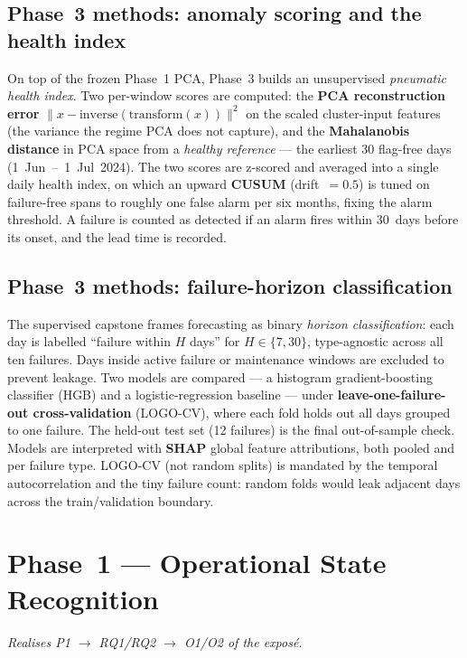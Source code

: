 \documentclass[11pt,a4paper]{article}
\begin{document}
\subsection{Phase~3 methods: anomaly scoring and the health index}
On top of the frozen Phase~1 PCA, Phase~3 builds an unsupervised \emph{pneumatic health
index}. Two per-window scores are computed: the \textbf{PCA reconstruction error}
$\lVert x - \mathrm{inverse}(\mathrm{transform}(x))\rVert^2$ on the scaled cluster-input
features (the variance the regime PCA does not capture), and the \textbf{Mahalanobis
distance} in PCA space from a \emph{healthy reference} --- the earliest 30 flag-free days
(1~Jun~--~1~Jul~2024). The two scores are z-scored and averaged into a single daily
health index, on which an upward \textbf{CUSUM} (drift~$=0.5$) is tuned on failure-free
spans to roughly one false alarm per six months, fixing the alarm threshold. A failure
is counted as detected if an alarm fires within 30~days before its onset, and the lead
time is recorded.

\subsection{Phase~3 methods: failure-horizon classification}
The supervised capstone frames forecasting as binary \emph{horizon classification}: each
day is labelled ``failure within $H$ days'' for $H\in\{7,30\}$, type-agnostic across all
ten failures. Days inside active failure or maintenance windows are excluded to prevent
leakage. Two models are compared --- a histogram gradient-boosting classifier (HGB) and a
logistic-regression baseline --- under \textbf{leave-one-failure-out cross-validation}
(LOGO-CV), where each fold holds out all days grouped to one failure. The held-out test
set (12 failures) is the final out-of-sample check. Models are interpreted with
\textbf{SHAP} global feature attributions, both pooled and per failure type. LOGO-CV (not
random splits) is mandated by the temporal autocorrelation and the tiny failure count:
random folds would leak adjacent days across the train/validation boundary.

\setcounter{section}{4}
\section{Phase~1 --- Operational State Recognition}
\label{sec:phase1}

\textit{Realises P1 $\rightarrow$ RQ1/RQ2 $\rightarrow$ O1/O2 of the exposé.}
\end{document}

